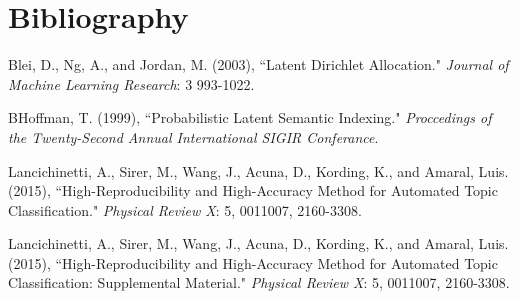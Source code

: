 \documentclass[12pt]{article}
\begin{document}
\newpage
\section{Bibliography}
\begin{thebibliography}{4}

	Blei, D., Ng, A., and Jordan, M.  (2003),
	``Latent Dirichlet Allocation."
	\textit{Journal of Machine Learning Research}: 3 993-1022.
	
	BHoffman, T.  (1999),
	``Probabilistic Latent Semantic Indexing."
	\textit{Proccedings of the Twenty-Second Annual International SIGIR Conferance}.
	
	Lancichinetti, A., Sirer, M., Wang, J., Acuna, D., Kording, K., and Amaral, Luis. (2015),
	``High-Reproducibility and High-Accuracy Method for Automated Topic Classification."
	\textit{Physical Review X}: 5, 0011007, 2160-3308.
	
	Lancichinetti, A., Sirer, M., Wang, J., Acuna, D., Kording, K., and Amaral, Luis. (2015),
	``High-Reproducibility and High-Accuracy Method for Automated Topic Classification: Supplemental Material."
	\textit{Physical Review X}: 5, 0011007, 2160-3308.
	
\end{thebibliography}
	
	
	
\end{document}
